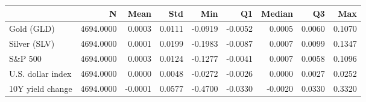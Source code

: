 \begin{tabular}{lrrrrrrrr}
\toprule
 & N & Mean & Std & Min & Q1 & Median & Q3 & Max \\
\midrule
Gold (GLD) & 4694.0000 & 0.0003 & 0.0111 & -0.0919 & -0.0052 & 0.0005 & 0.0060 & 0.1070 \\
Silver (SLV) & 4694.0000 & 0.0001 & 0.0199 & -0.1983 & -0.0087 & 0.0007 & 0.0099 & 0.1347 \\
S\&P 500 & 4694.0000 & 0.0003 & 0.0124 & -0.1277 & -0.0041 & 0.0007 & 0.0058 & 0.1096 \\
U.S. dollar index & 4694.0000 & 0.0000 & 0.0048 & -0.0272 & -0.0026 & 0.0000 & 0.0027 & 0.0252 \\
10Y yield change & 4694.0000 & -0.0001 & 0.0577 & -0.4700 & -0.0330 & -0.0020 & 0.0330 & 0.3320 \\
\bottomrule
\end{tabular}
